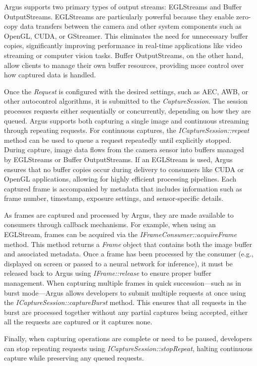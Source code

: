 Argus supports two primary types of output streams: EGLStreams and Buffer
OutputStreams. EGLStreams are particularly powerful because they enable
zero-copy data transfers between the camera and other system components such as
OpenGL, CUDA, or GStreamer. This eliminates the need for unnecessary buffer
copies, significantly improving performance in real-time applications like
video streaming or computer vision tasks. Buffer OutputStreams, on the other
hand, allow clients to manage their own buffer resources, providing more
control over how captured data is handled.

Once the \textit{Request} is configured with the desired settings, such as
AEC, AWB, or other autocontrol algorithms, it is submitted to the
\textit{CaptureSession}. The session processes requests either sequentially or
concurrently, depending on how they are queued. Argus supports both capturing a
single image and continuous streaming through repeating requests. For continuous
captures, the \textit{ICaptureSession::repeat} method can be used to queue a request
repeatedly until explicitly stopped. During capture, image data flows from the
camera sensor into buffers managed by EGLStreams or Buffer OutputStreams. If an
EGLStream is used, Argus ensures that no buffer copies occur during delivery to
consumers like CUDA or OpenGL applications, allowing for highly efficient
processing pipelines. Each captured frame is accompanied by metadata that
includes information such as frame number, timestamp, exposure settings, and
sensor-specific details.

As frames are captured and processed by Argus, they are made available to
consumers through callback mechanisms. For example, when using an EGLStream,
frames can be acquired via the \textit{IFrameConsumer::acquireFrame} method.
This method returns a \textit{Frame} object that contains both the image buffer
and associated metadata. Once a frame has been processed by the consumer (e.g.,
displayed on screen or passed to a neural network for inference), it must be
released back to Argus using \textit{IFrame::release} to ensure proper buffer
management. When capturing multiple frames in quick succession—such as in burst
mode—Argus allows developers to submit multiple requests at once using the
\textit{ICaptureSession::captureBurst} method. This ensures that all requests
in the burst are processed together without any partial captures being
accepted, either all the requests are captured or it captures none.

Finally, when capturing operations are complete or need to be paused,
developers can stop repeating requests using \textit{ICaptureSession::stopRepeat}, halting
continuous capture while preserving any queued requests.

